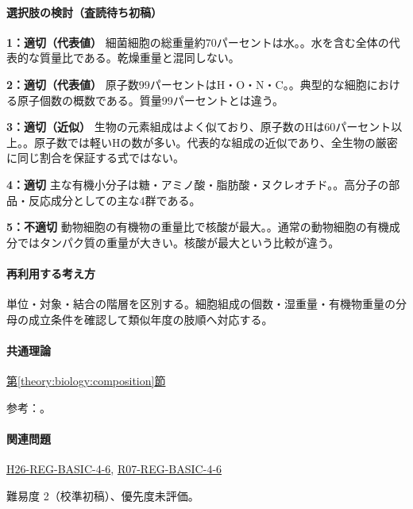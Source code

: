 \paragraph{選択肢の検討（査読待ち初稿）}\mbox{}\par

\noindent\textbf{1：適切（代表値）} 細菌細胞の総重量約70パーセントは水。。水を含む全体の代表的な質量比である。乾燥重量と混同しない。\par

\noindent\textbf{2：適切（代表値）} 原子数99パーセントはH・O・N・C。。典型的な細胞における原子個数の概数である。質量99パーセントとは違う。\par

\noindent\textbf{3：適切（近似）} 生物の元素組成はよく似ており、原子数のHは60パーセント以上。。原子数では軽いHの数が多い。代表的な組成の近似であり、全生物の厳密に同じ割合を保証する式ではない。\par

\noindent\textbf{4：適切} 主な有機小分子は糖・アミノ酸・脂肪酸・ヌクレオチド。。高分子の部品・反応成分としての主な4群である。\par

\noindent\textbf{5：不適切} 動物細胞の有機物の重量比で核酸が最大。。通常の動物細胞の有機成分ではタンパク質の重量が大きい。核酸が最大という比較が違う。\par

\paragraph{再利用する考え方} 単位・対象・結合の階層を区別する。細胞組成の個数・湿重量・有機物重量の分母の成立条件を確認して類似年度の肢順へ対応する。

\paragraph{共通理論} \hyperref[theory:biology:composition]{第\ref*{theory:biology:composition}節}

\par 参考：\cite{bio_composition}。

\paragraph{関連問題} \hyperref[q:h26-reg-basic-4-6]{H26-REG-BASIC-4-6}, \hyperref[q:r07-reg-basic-4-6]{R07-REG-BASIC-4-6}

\par 難易度 2（校準初稿）、優先度未評価。

